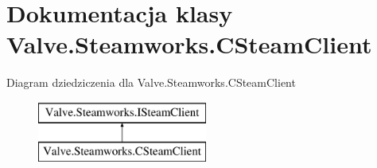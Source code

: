 \hypertarget{class_valve_1_1_steamworks_1_1_c_steam_client}{}\section{Dokumentacja klasy Valve.\+Steamworks.\+C\+Steam\+Client}
\label{class_valve_1_1_steamworks_1_1_c_steam_client}
Diagram dziedziczenia dla Valve.\+Steamworks.\+C\+Steam\+Client\begin{figure}[H]
\begin{center}
\leavevmode
\includegraphics[height=2.000000cm]{class_valve_1_1_steamworks_1_1_c_steam_client}
\end{center}
\end{figure}
